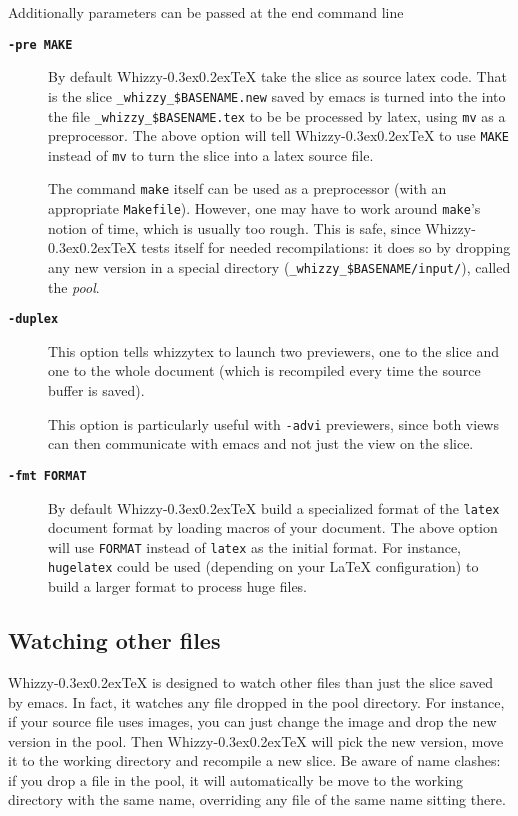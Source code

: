 \documentclass{article}
\makeatletter
\let \lst \verb
\def \whizzy {{Whizzy\kern -0.3ex\raise 0.2ex\hbox{\let \@\relax\TeX}}}
\makeatother
\begin{document}
Additionally parameters can be passed at the end command line

\begin{description}
\item[{\bf {\tt -pre MAKE}}]\indent
\label {make}

By default {\whizzy} take the slice as source latex code. 
That is the slice 
\lst"_whizzy_$BASENAME.new" saved by emacs is turned into the 
into the file \lst"_whizzy_$BASENAME.tex" to be be processed by latex,
using \lst"mv" as a preprocessor.  The above option will tell {\whizzy} to
use \lst"MAKE" instead of \lst"mv" to turn the slice into a latex source
file.

The command \lst"make" itself can be used as a preprocessor (with an
appropriate \lst"Makefile").  However, one may have to work around
\lst"make"'s notion of time, which is usually too rough. 
This is safe, since
{\whizzy} tests itself for needed recompilations: it does so by dropping any
new version in a  special directory (\lst"_whizzy_$BASENAME/input/"), 
called the {\em pool}.

\item[{\bf {\tt -duplex}}]\indent
\label {dupplex}

This option tells whizzytex to launch two previewers, one to the slice and
one to the whole document (which is recompiled every time the source buffer
is saved).

This option is particularly useful with \lst"-advi" previewers, since both
views can then communicate with emacs and not just the view on the slice.

\item[{\bf {\tt -fmt FORMAT}}]\indent

By default {\whizzy} build a specialized format of the \lst"latex" document
format by loading macros of your document.  The above option will use
\lst"FORMAT" instead of \lst"latex" as the initial format. For instance,
\lst"hugelatex" could be used (depending on your {\LaTeX} configuration) to
build a larger format to process huge files.

\end{description}



\subsection {Watching other files}

{\whizzy} is designed to watch other files than just the slice saved by
emacs. In fact, it watches any file dropped in the pool directory. 
For instance, 
if your source file uses images, you can just change the image and
drop the new version in the pool. Then {\whizzy} will pick the new version,
move it to the working directory and recompile a new slice. Be aware of name
clashes: if you drop a file in the pool, it will automatically be move to
the working directory with the same name, overriding any file of the same
name sitting there. 
\end{document}
